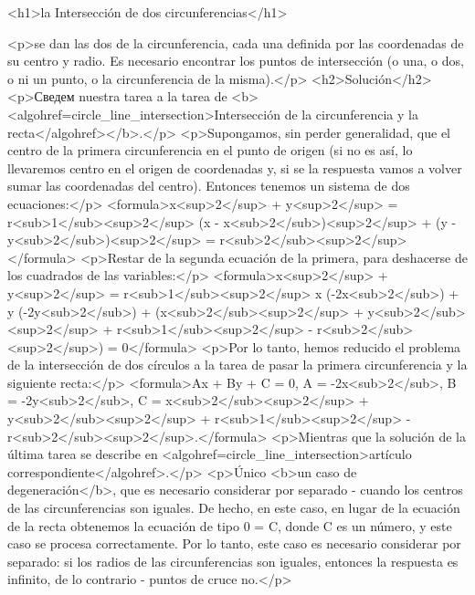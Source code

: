 <h1>la Intersección de dos circunferencias</h1>

<p>se dan las dos de la circunferencia, cada una definida por las coordenadas de su centro y radio. Es necesario encontrar los puntos de intersección (o una, o dos, o ni un punto, o la circunferencia de la misma).</p>
<h2>Solución</h2>
<p>Сведем nuestra tarea a la tarea de <b><algohref=circle_line_intersection>Intersección de la circunferencia y la recta</algohref></b>.</p>
<p>Supongamos, sin perder generalidad, que el centro de la primera circunferencia en el punto de origen (si no es así, lo llevaremos centro en el origen de coordenadas y, si se la respuesta vamos a volver sumar las coordenadas del centro). Entonces tenemos un sistema de dos ecuaciones:</p>
<formula>x<sup>2</sup> + y<sup>2</sup> = r<sub>1</sub><sup>2</sup>
(x - x<sub>2</sub>)<sup>2</sup> + (y - y<sub>2</sub>)<sup>2</sup> = r<sub>2</sub><sup>2</sup></formula>
<p>Restar de la segunda ecuación de la primera, para deshacerse de los cuadrados de las variables:</p>
<formula>x<sup>2</sup> + y<sup>2</sup> = r<sub>1</sub><sup>2</sup>
x (-2x<sub>2</sub>) + y (-2y<sub>2</sub>) + (x<sub>2</sub><sup>2</sup> + y<sub>2</sub><sup>2</sup> + r<sub>1</sub><sup>2</sup> - r<sub>2</sub><sup>2</sup>) = 0</formula>
<p>Por lo tanto, hemos reducido el problema de la intersección de dos círculos a la tarea de pasar la primera circunferencia y la siguiente recta:</p>
<formula>Ax + By + C = 0,
A = -2x<sub>2</sub>,
B = -2y<sub>2</sub>,
C = x<sub>2</sub><sup>2</sup> + y<sub>2</sub><sup>2</sup> + r<sub>1</sub><sup>2</sup> - r<sub>2</sub><sup>2</sup>.</formula>
<p>Mientras que la solución de la última tarea se describe en <algohref=circle_line_intersection>artículo correspondiente</algohref>.</p>
<p>Único <b>un caso de degeneración</b>, que es necesario considerar por separado - cuando los centros de las circunferencias son iguales. De hecho, en este caso, en lugar de la ecuación de la recta obtenemos la ecuación de tipo 0 = C, donde C es un número, y este caso se procesa correctamente. Por lo tanto, este caso es necesario considerar por separado: si los radios de las circunferencias son iguales, entonces la respuesta es infinito, de lo contrario - puntos de cruce no.</p>